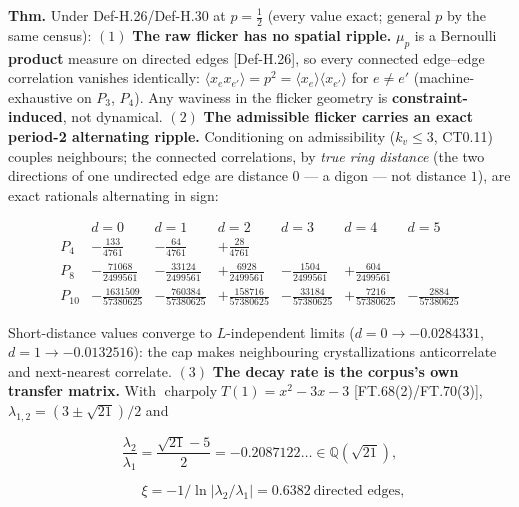 \begin{theorem}\label{tag:FT-86}
\textbf{Thm.} Under Def-H.26/Def-H.30 at $p=\tfrac12$ (every value exact; general $p$ by the same census): $(1)$ \textbf{The raw flicker has no spatial ripple.} $\mu_p$ is a Bernoulli \textbf{product} measure on directed edges [Def-H.26], so every connected edge–edge correlation vanishes identically: $\langle x_ex_{e'}\rangle=p^2=\langle x_e\rangle\langle x_{e'}\rangle$ for $e\ne e'$ (machine-exhaustive on $P_3$, $P_4$). Any waviness in the flicker geometry is \textbf{constraint-induced}, not dynamical. $(2)$ \textbf{The admissible flicker carries an exact period-2 alternating ripple.} Conditioning on admissibility ($k_v\le3$, CT0.11) couples neighbours; the connected correlations, by \textit{true ring distance} (the two directions of one undirected edge are distance $0$ — a digon — not distance $1$), are exact rationals alternating in sign:

\[
\begin{array}{c|cccccc}
& d=0 & d=1 & d=2 & d=3 & d=4 & d=5\\
\hline
P_4 & -\tfrac{133}{4761} & -\tfrac{64}{4761} & +\tfrac{28}{4761} & & & \\
P_8 & -\tfrac{71068}{2499561} & -\tfrac{33124}{2499561} & +\tfrac{6928}{2499561} & -\tfrac{1504}{2499561} & +\tfrac{604}{2499561} & \\
P_{10} & -\tfrac{1631509}{57380625} & -\tfrac{760384}{57380625} & +\tfrac{158716}{57380625} & -\tfrac{33184}{57380625} & +\tfrac{7216}{57380625} & -\tfrac{2884}{57380625}
\end{array}
\]

Short-distance values converge to $L$-independent limits ($d{=}0\to-0.0284331$, $d{=}1\to-0.0132516$): the cap makes neighbouring crystallizations anticorrelate and next-nearest correlate. $(3)$ \textbf{The decay rate is the corpus's own transfer matrix.} With $\operatorname{charpoly}T(1)=x^2-3x-3$ [FT.68(2)/FT.70(3)], $\lambda_{1,2}=(3\pm\sqrt{21})/2$ and

\[
\frac{\lambda_2}{\lambda_1}=\frac{\sqrt{21}-5}{2}=-0.2087122\ldots\in\mathbb Q(\sqrt{21}),
\]

\[
\qquad \xi=-1/\ln|\lambda_2/\lambda_1|=0.6382\ \text{directed edges},
\]


\end{theorem}
